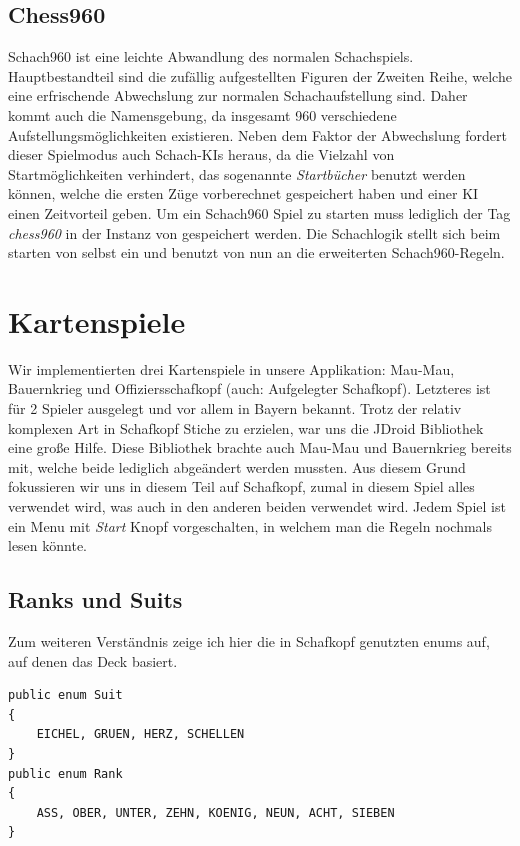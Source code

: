 \subsection{Chess960}
Schach960 ist eine leichte Abwandlung des normalen Schachspiels. 
Hauptbestandteil sind die zufällig aufgestellten Figuren der Zweiten Reihe, 
welche eine erfrischende Abwechslung zur normalen Schachaufstellung sind. Daher 
kommt auch die Namensgebung, da insgesamt 960 verschiedene 
Aufstellungsmöglichkeiten existieren. Neben dem Faktor der Abwechslung fordert 
dieser Spielmodus auch Schach-KIs heraus, da die Vielzahl von Startmöglichkeiten 
verhindert, das sogenannte \emph{Startbücher} benutzt werden können, welche die 
ersten Züge vorberechnet gespeichert haben und einer KI einen Zeitvorteil geben. 
Um ein Schach960 Spiel zu starten muss lediglich der Tag \emph{chess960} in der 
Instanz von  gespeichert werden. Die Schachlogik stellt sich beim 
starten von selbst ein und benutzt von nun an die erweiterten Schach960-Regeln.

\section{Kartenspiele}
\sectionauthor{\philipp}

Wir implementierten drei Kartenspiele in unsere Applikation: Mau-Mau,
Bauernkrieg und Offiziersschafkopf (auch: Aufgelegter Schafkopf). Letzteres ist
für 2 Spieler ausgelegt und vor allem in Bayern bekannt. Trotz der relativ
komplexen Art in Schafkopf Stiche zu erzielen, war uns die JDroid Bibliothek
eine große Hilfe. Diese Bibliothek brachte auch Mau-Mau und Bauernkrieg bereits
mit, welche beide lediglich abgeändert werden mussten.  Aus diesem Grund
fokussieren wir uns in diesem Teil auf Schafkopf, zumal in diesem Spiel alles
verwendet wird, was auch in den anderen beiden verwendet wird. Jedem Spiel ist
ein Menu mit \emph{Start} Knopf vorgeschalten, in welchem man die Regeln
nochmals lesen könnte.

\subsection{Ranks und Suits}

Zum weiteren Verständnis zeige ich hier die in Schafkopf genutzten enums auf,
auf denen das Deck basiert.

\begin{lstlisting}[caption={Enums für Kartenwertigkeiten},captionpos=b]
public enum Suit
{
    EICHEL, GRUEN, HERZ, SCHELLEN
}
public enum Rank
{
    ASS, OBER, UNTER, ZEHN, KOENIG, NEUN, ACHT, SIEBEN
}
\end{lstlisting}

